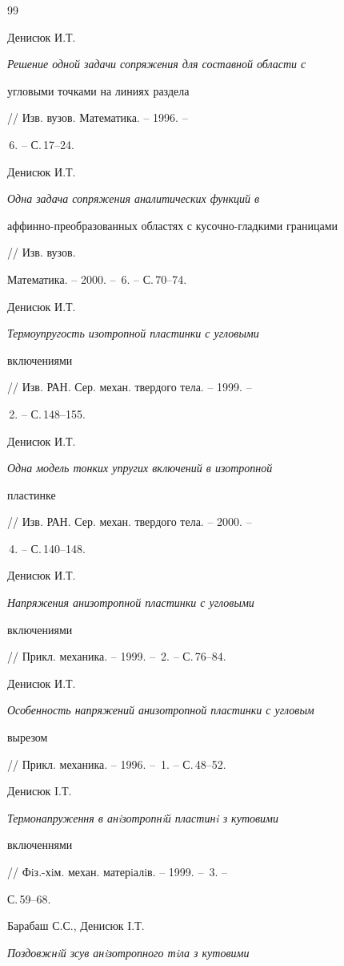 \begin{thebibliography}{99} 


 




Денисюк И.Т. {\em Решение одной задачи сопряжения для составной области с  


угловыми точками на линиях раздела} // Изв. вузов. Математика. -- 1996. -- 


\No\,6. -- С.\,17--24. 




Денисюк И.Т. {\em Одна задача сопряжения аналитических функций в  


аффинно-преобразованных областях с кусочно-гладкими границами} // Изв. вузов.  


Математика. -- 2000. -- \No\,6. -- С.\,70--74. 




Денисюк И.Т. {\em Термоупругость изотропной пластинки с угловыми  


включениями} // Изв. РАН. Сер. механ. твердого тела. -- 1999. -- 


\No\,2. -- С.\,148--155. 




Денисюк И.Т. {\em Одна модель тонких упругих включений в изотропной  


пластинке} // Изв. РАН. Сер. механ. твердого тела. -- 2000. -- 


\No\,4. -- С.\,140--148. 




Денисюк И.Т. {\em Напряжения анизотропной пластинки с угловыми  


включениями} // Прикл. механика. -- 1999. -- \No\,2. -- С.\,76--84. 




Денисюк И.Т. {\em Особенность напряжений анизотропной пластинки с угловым  


вырезом} // Прикл. механика. -- 1996. -- \No\,1. -- С.\,48--52. 




Денисюк I.Т. {\em Термонапруження в анiзотропнiй пластинi з кутовими  


включеннями} // Фiз.-хiм. механ. матерiалiв. -- 1999. -- \No\,3. -- 


С.\,59--68. 




Барабаш С.С., Денисюк I.Т. {\em Поздовжнiй зсув анiзотропного тiла з кутовими  


}
\end{thebibliography}
